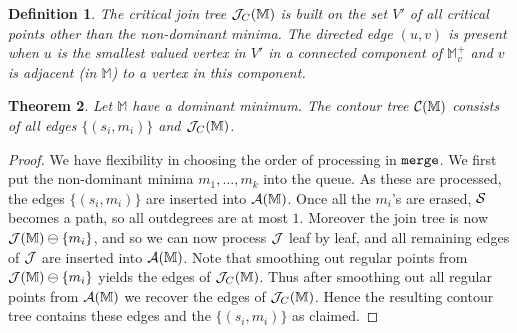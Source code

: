 \documentclass[11pt]{article}
\newtheorem{theorem}{Theorem}[section]
\newtheorem{definition}[theorem]{Definition}
\theoremstyle{definition}
\newcommand{\cA}{{\cal A}}
\newcommand{\cC}{{\cal C}}
\newcommand{\cJ}{{\cal J}}
\newcommand{\cS}{{\cal S}}
\newcommand{\MM}{\mathbb{M}}
\newcommand{\jc}{\cJ_C}
\newcommand{\merge}{{\tt merge}}
\begin{document}
\begin{definition} 
\label{def:criticalJoin}
The \emph{critical join tree} $\jc(\MM)$ is built on the set $V'$ of all
critical points other than the non-dominant minima. 
The directed edge $(u,v)$ is present when $u$ is the smallest valued vertex in $V'$ in a connected component of $\MM^+_v$
and $v$ is adjacent (in $\MM$) to a vertex in this component. 
\end{definition}

\begin{theorem} \label{thm:contour-tree} Let $\MM$ have a dominant minimum. 
The contour tree $\cC(\MM)$ consists of all edges $\{(s_i, m_i)\}$ and $\jc(\MM)$.
\end{theorem}
\begin{proof} %
We have flexibility in choosing the order of processing in $\merge$. We first put the non-dominant
minima $m_1, \ldots, m_k$ into the queue. As these are processed, the edges $\{(s_i,m_i)\}$ are inserted 
into $\cA(\MM)$. Once all the $m_i$'s are erased, $\cS$ becomes a path, so all outdegrees are at most $1$.
Moreover the join tree is now $\cJ(\MM) \ominus \{m_i\}$, and so we can now process $\cJ$ leaf by leaf, and all
remaining edges of $\cJ$ are inserted into $\cA(\MM)$.
%
Note that smoothing out regular points from $\cJ(\MM) \ominus \{m_i\}$ yields the edges of $\jc(\MM)$.
Thus after smoothing out all regular points from $\cA(\MM)$ we recover the edges of $\jc(\MM)$.  
Hence the resulting contour tree contains these edges and the $\{(s_i,m_i)\}$ as claimed.
\end{proof}
\end{document}
